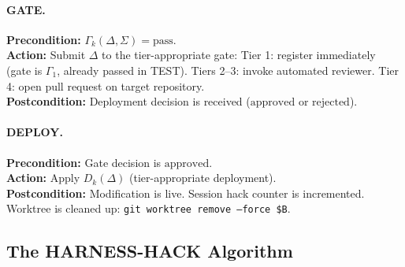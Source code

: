 \documentclass[11pt]{article}
\begin{document}
\paragraph{GATE.}
\textbf{Precondition:} $\Gamma_k(\Delta, \Sigma) = \text{pass}$. \\
\textbf{Action:} Submit $\Delta$ to the tier-appropriate gate:
Tier 1: register immediately (gate is $\Gamma_1$, already passed in TEST).
Tiers 2--3: invoke automated reviewer.
Tier 4: open pull request on target repository. \\
\textbf{Postcondition:} Deployment decision is received ($\text{approved}$ or
$\text{rejected}$).

\paragraph{DEPLOY.}
\textbf{Precondition:} Gate decision is $\text{approved}$. \\
\textbf{Action:} Apply $D_k(\Delta)$ (tier-appropriate deployment). \\
\textbf{Postcondition:} Modification is live. Session hack counter is
incremented. Worktree is cleaned up: \texttt{git worktree remove --force \$B}.

\subsection{The HARNESS-HACK Algorithm}
\label{sec:algorithm}
\end{document}
